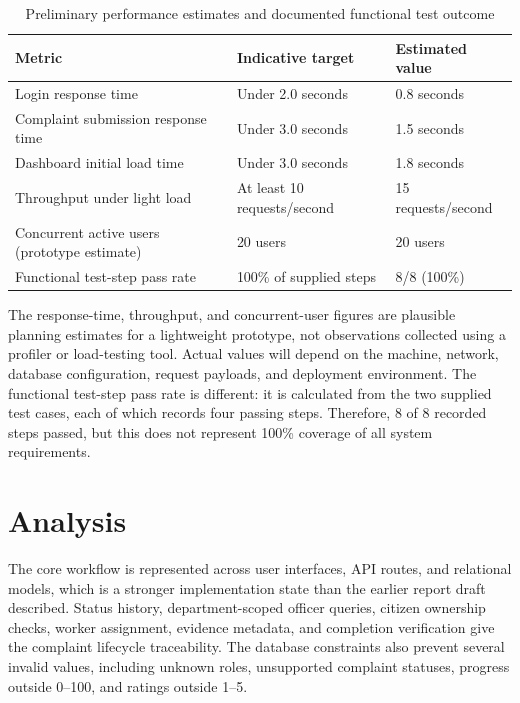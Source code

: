 \documentclass[12pt,a4paper]{report}
\begin{document}
\begin{table}[H]
\centering
\small
\begin{tabular}{p{}p{}p{}}
\toprule
\textbf{Metric} & \textbf{Indicative target} & \textbf{Estimated value} \\
\midrule
Login response time & Under 2.0 seconds & 0.8 seconds \\
Complaint submission response time & Under 3.0 seconds & 1.5 seconds \\
Dashboard initial load time & Under 3.0 seconds & 1.8 seconds \\
Throughput under light load & At least 10 requests/second & 15 requests/second \\
Concurrent active users (prototype estimate) & 20 users & 20 users \\
Functional test-step pass rate & 100\% of supplied steps & 8/8 (100\%) \\
\bottomrule
\end{tabular}
\caption{Preliminary performance estimates and documented functional test outcome}
\label{tab:performance}
\end{table}

The response-time, throughput, and concurrent-user figures are plausible
planning estimates for a lightweight prototype, not observations collected
using a profiler or load-testing tool. Actual values will depend on the
machine, network, database configuration, request payloads, and deployment
environment. The functional test-step pass rate is different: it is calculated
from the two supplied test cases, each of which records four passing steps.
Therefore, 8 of 8 recorded steps passed, but this does not represent 100\%
coverage of all system requirements.

\section{Analysis}

The core workflow is represented across user interfaces, API routes, and relational models, which is a stronger implementation state than the earlier report draft described. Status history, department-scoped officer queries, citizen ownership checks, worker assignment, evidence metadata, and completion verification give the complaint lifecycle traceability. The database constraints also prevent several invalid values, including unknown roles, unsupported complaint statuses, progress outside 0--100, and ratings outside 1--5.
\end{document}
